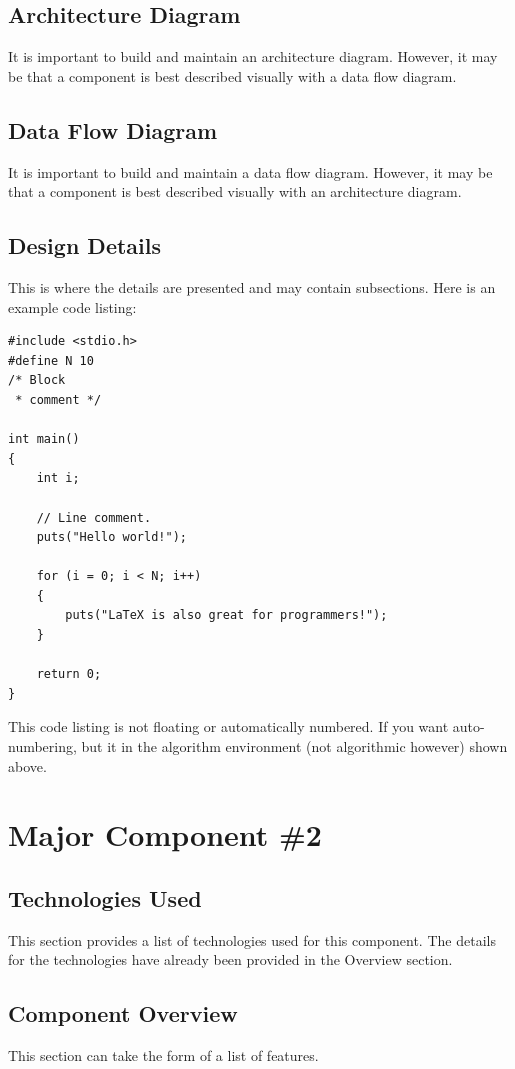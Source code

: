 \subsection{ Architecture  Diagram}
It is important to build and maintain an architecture diagram.  However, it may 
be that a component is best described visually with a data flow diagram. 


\subsection{Data Flow Diagram}
It is important to build and maintain a data flow diagram.  However, it may be 
that a component is best described visually with an architecture diagram. 


\subsection{Design Details}
This is where the details are presented and may contain subsections.   Here is an example code listing:
\begin{lstlisting}
#include <stdio.h>
#define N 10
/* Block
 * comment */
 
int main()
{
    int i;
 
    // Line comment.
    puts("Hello world!");
 
    for (i = 0; i < N; i++)
    {
        puts("LaTeX is also great for programmers!");
    }
 
    return 0;
}
\end{lstlisting}
This code listing is not floating or automatically numbered.  If you want auto-numbering, but it in the algorithm environment (not algorithmic however) shown above.



\section{Major Component \#2 }

\subsection{Technologies  Used}
This section provides a list of technologies used for this component.  The details 
for the technologies have already been provided in the Overview section. 

\subsection{Component  Overview}
This section can take the form of a list of features. 

